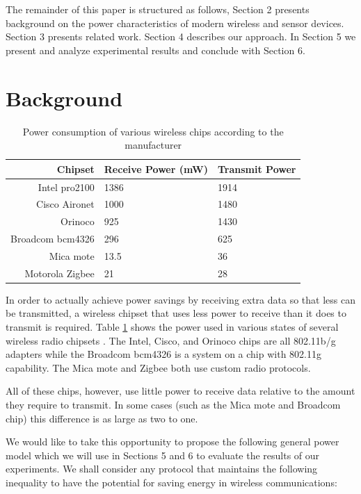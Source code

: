 \documentclass[conference]{IEEEtran}
\begin{document}
The remainder of this paper is structured as follows, Section 2
presents background on the power characteristics of modern wireless
and sensor devices.  Section 3 presents related work.  Section 4
describes our approach.  In Section 5 we present and analyze experimental
results and conclude with Section 6.

\section{Background}

\begin{table}
\begin{center}
\begin{tabular}{|r|l|l|}
\hline
Chipset & Receive Power (mW) & Transmit Power\\
\hline
\hline
Intel pro2100 & 1386 & 1914\\
\hline
Cisco Aironet & 1000 & 1480\\
\hline
Orinoco & 925 & 1430\\
\hline
Broadcom bcm4326 & 296 & 625\\
\hline
Mica mote & 13.5 & 36 \\
\hline
Motorola Zigbee & 21 & 28\\
\hline
\end{tabular}

\caption{Power consumption of various wireless chips according to the manufacturer}
\label{tab:wireless_power}
\end{center}
\end{table}

In order to actually achieve power savings by receiving extra data so
that less can be transmitted, a wireless chipset that uses less power to
receive than it does to transmit is required.  Table \ref{tab:wireless_power}
shows the power used in various states of several wireless radio chipsets
\cite{power_management}\cite{intel_g}\cite{broadcom_g}\cite{zigbee}.  The 
Intel, Cisco, and Orinoco chips are all 802.11b/g adapters while the Broadcom
bcm4326 is a system on a chip with 802.11g capability.  The Mica mote and 
Zigbee both use custom radio protocols.

All of these chips, however, use little power to receive data relative to
the amount they require to transmit.  In some cases (such as the Mica mote
and Broadcom chip) this difference is as large as two to one.

We would like to take this opportunity to propose the following general 
power model which we will use in Sections 5 and 6 to evaluate the results 
of our  experiments.  We shall consider any protocol that maintains the 
following inequality to have the potential for saving energy in wireless 
communications:
\end{document}
